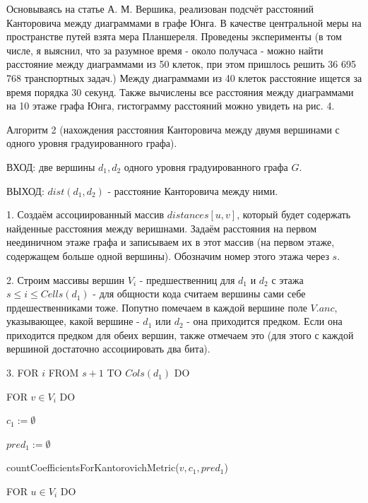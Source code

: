 \documentclass[12pt]{report}
\begin{document}
\hspace{\parindent} Основываясь на статье А. М. Вершика, реализован подсчёт расстояний Канторовича между диаграммами в графе Юнга. В качестве центральной меры на пространстве путей взята мера Планшереля. Проведены эксперименты (в том числе, я выяснил, что за разумное время - около получаса - можно найти расстояние между диаграммами из 50 клеток, при этом пришлось решить 36 695 768 транспортных задач.) Между диаграммами из 40 клеток расстояние ищется за время порядка 30 секунд. Также вычислены все расстояния между диаграммами на 10 этаже графа Юнга, гистограмму расстояний можно увидеть на рис. 4.

\vspace{1cm}

Алгоритм 2 (нахождения расстояния Канторовича между двумя вершинами с одного уровня градуированного графа).

ВХОД: две вершины $d_1, d_2$ одного уровня градуированного графа $G$.

ВЫХОД: $dist(d_1, d_2)$ - расстояние Канторовича между ними.

1. Создаём ассоциированный массив $distances[u, v]$, который будет содержать найденные расстояния между веришнами. Задаём расстояния на первом неединичном этаже графа и записываем их в этот массив (на первом этаже, содержащем больше одной вершины). Обозначим номер этого этажа через $s$.

2. Строим массивы вершин $V_i$ - предшественниц для $d_1$ и  $d_2$ с этажа $s \le i \le Cells(d_1)$ - для общности кода считаем вершины сами себе прдешественниками тоже. Попутно помечаем в каждой вершине поле $V.anc$, указывающее, какой вершине - $d_1$ или $d_2$ - она приходится предком. Если она приходится предком для обеих вершин, также отмечаем это (для этого с каждой вершиной достаточно ассоциировать два бита). 

3. FOR $i$ FROM $s + 1$ TO $Cols(d_1)$ DO

\hspace{1cm} FOR $v \in V_i$ DO

\hspace{2cm} $c_1 := \emptyset$

\hspace{2cm} $pred_1 := \emptyset$

\hspace{2cm} countCoefficientsForKantorovichMetric($v, c_1, pred_1$)

\hspace{2cm} FOR $u \in V_i$ DO
\end{document}
